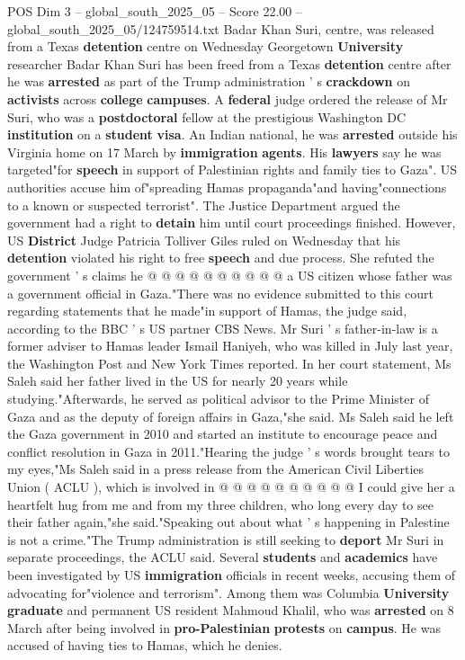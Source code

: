 \begin{textsample}{POS Dim 3 – global\_south\_2025\_05 – Score 22.00 – global\_south\_2025\_05/124759514.txt}  \label{ex:f3_pos_279}
Badar Khan Suri, centre, was released from a Texas \textbf{detention} centre on Wednesday Georgetown \textbf{University} researcher Badar Khan Suri has been freed from a Texas \textbf{detention} centre after he was \textbf{arrested} as part of the Trump administration ' s \textbf{crackdown} on \textbf{activists} across \textbf{college} \textbf{campuses}.
A \textbf{federal} judge ordered the release of Mr Suri, who was a \textbf{postdoctoral} fellow at the prestigious Washington DC \textbf{institution} on a \textbf{student} \textbf{visa}.
An Indian national, he was \textbf{arrested} outside his Virginia home on 17 March by \textbf{immigration} \textbf{agents}.
His \textbf{lawyers} say he was targeted"for \textbf{speech} in support of Palestinian rights and family ties to Gaza".
US authorities accuse him of"spreading Hamas propaganda"and having"connections to a known or suspected terrorist".
The Justice Department argued the government had a right to \textbf{detain} him until court proceedings finished.
However, US \textbf{District} Judge Patricia Tolliver Giles ruled on Wednesday that his \textbf{detention} violated his right to free \textbf{speech} and due process.
She refuted the government ' s claims he @ @ @ @ @ @ @ @ @ @ a US citizen whose father was a government official in Gaza."There was no evidence submitted to this court regarding statements that he made"in support of Hamas, the judge said, according to the BBC ' s US partner CBS News.
Mr Suri ' s father-in-law is a former adviser to Hamas leader Ismail Haniyeh, who was killed in July last year, the Washington Post and New York Times reported.
In her court statement, Ms Saleh said her father lived in the US for nearly 20 years while studying."Afterwards, he served as political advisor to the Prime Minister of Gaza and as the deputy of foreign affairs in Gaza,"she said.
Ms Saleh said he left the Gaza government in 2010 and started an institute to encourage peace and conflict resolution in Gaza in 2011."Hearing the judge ' s words brought tears to my eyes,"Ms Saleh said in a press release from the American Civil Liberties Union ( ACLU ), which is involved in @ @ @ @ @ @ @ @ @ @ I could give her a heartfelt hug from me and from my three children, who long every day to see their father again,"she said."Speaking out about what ' s happening in Palestine is not a crime."The Trump administration is still seeking to \textbf{deport} Mr Suri in separate proceedings, the ACLU said.
Several \textbf{students} and \textbf{academics} have been investigated by US \textbf{immigration} officials in recent weeks, accusing them of advocating for"violence and terrorism".
Among them was Columbia \textbf{University} \textbf{graduate} and permanent US resident Mahmoud Khalil, who was \textbf{arrested} on 8 March after being involved in \textbf{pro-Palestinian} \textbf{protests} on \textbf{campus}.
He was accused of having ties to Hamas, which he denies.

\end{textsample}
